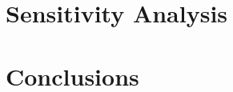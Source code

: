 \documentclass{article}
\begin{document}
\section{Sensitivity Analysis}

\section{Conclusions}







\end{document}
